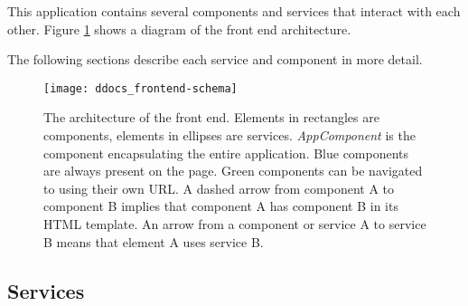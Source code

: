 This application contains several components and services that interact with each other. Figure \ref{fig:frontend-schema} shows a diagram of the front end architecture.

The following sections describe each service and component in more detail.

\begin{figure}[!h]
\centering
\texttt{[image: ddocs\_frontend-schema]}
\caption{The architecture of the front end. Elements in rectangles are components, elements in ellipses are services. \emph{AppComponent} is the component encapsulating
the entire application. Blue components are always present on the page. Green components can be navigated to using their own URL. A dashed arrow from component A
to component B implies that component A has component B in its HTML template. An arrow from a component or service A to service B means that element A uses service B.}
\label{fig:frontend-schema}
\end{figure}

\subsection{Services}

